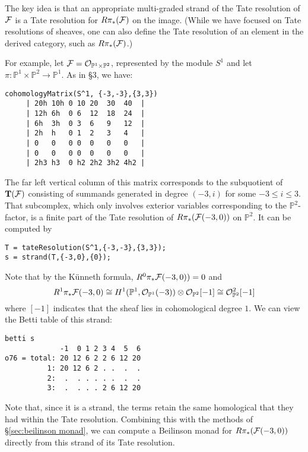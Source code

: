 \documentclass[twoside,12pt, leqno]{amsart}
\def\PP{{\mathbb P}}
\def\bT{{\bf T}}
\def\bU{{\bf U}}
\begin{document}
The key idea is that an appropriate multi-graded strand of the Tate resolution of ${\mathcal F}$ is a Tate resolution for $R\pi_*({\mathcal F})$ on the image.  (While we have focused on Tate resolutions of sheaves, one can also define the Tate resolution of an element in the derived category, such as $R\pi_*({\mathcal F})$.)

For example, let $\sF=\cO_{\PP^1\times \PP^2}$, represented by the module $S^1$ and let $\pi:\PP^1\times \PP^2\to \PP^1$.  As in \S3, we have:
{\small 
\begin{verbatim}
cohomologyMatrix(S^1, {-3,-3},{3,3})
     | 20h 10h 0 10 20  30  40  |
     | 12h 6h  0 6  12  18  24  |
     | 6h  3h  0 3  6   9   12  |
     | 2h  h   0 1  2   3   4   |
     | 0   0   0 0  0   0   0   |
     | 0   0   0 0  0   0   0   |
     | 2h3 h3  0 h2 2h2 3h2 4h2 |
\end{verbatim}
} 
The far left vertical column of this matrix corresponds to the subquotient of $\bT(\sF)$ consisting of summands generated in degree $(-3,i)$ for some $-3 \leq i\leq 3$.  That subcomplex, which only involves exterior variables corresponding to the $\PP^2$-factor, is a finite part of the Tate resolution of $R\pi_*({\mathcal F}(-3,0))$ on $\PP^2$.  It can be computed by
\begin{verbatim}
T = tateResolution(S^1,{-3,-3},{3,3});
s = strand(T,{-3,0},{0});
\end{verbatim}
Note that by the K\"unneth formula, $R^0\pi_* {\mathcal F}(-3,0))=0$ and
\[
R^1\pi_*\sF(-3,0)\cong H^1(\PP^1,\cO_{\PP^1}(-3))\otimes \cO_{\PP^2}[-1] \cong \cO_{\PP^2}^2[-1]
\]
where $[-1]$ indicates that the sheaf lies in cohomological degree $1$.   We can view the Betti table of this strand:
\begin{verbatim}
betti s
             -1  0 1 2 3 4  5  6
o76 = total: 20 12 6 2 2 6 12 20
          1: 20 12 6 2 . .  .  .
          2:  .  . . . . .  .  .
          3:  .  . . . 2 6 12 20
\end{verbatim}
Note that, since it is a strand, the terms retain the same homological that they had within the Tate resolution.  Combining this with the methods of \S\ref{sec:beilinson monad}, we can compute a Beilinson monad for $R\pi_*({\mathcal F}(-3,0))$ directly from this strand of its Tate resolution.


%
%
%
\end{document}
